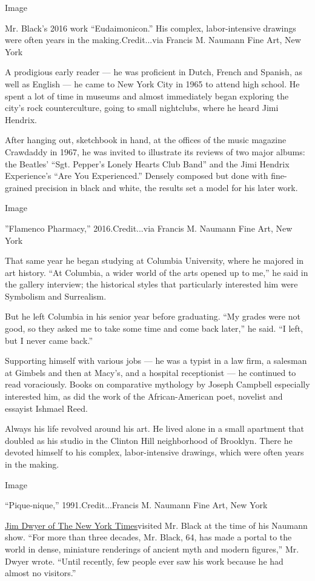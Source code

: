 Image

Mr. Black's 2016 work ``Eudaimonicon.'' His complex, labor-intensive
drawings were often years in the making.Credit...via Francis M. Naumann
Fine Art, New York

A prodigious early reader --- he was proficient in Dutch, French and
Spanish, as well as English --- he came to New York City in 1965 to
attend high school. He spent a lot of time in museums and almost
immediately began exploring the city's rock counterculture, going to
small nightclubs, where he heard Jimi Hendrix.

After hanging out, sketchbook in hand, at the offices of the music
magazine Crawdaddy in 1967, he was invited to illustrate its reviews of
two major albums: the Beatles' ``Sgt. Pepper's Lonely Hearts Club Band''
and the Jimi Hendrix Experience's ``Are You Experienced.'' Densely
composed but done with fine-grained precision in black and white, the
results set a model for his later work.

Image

''Flamenco Pharmacy,'' 2016.Credit...via Francis M. Naumann Fine Art,
New York

That same year he began studying at Columbia University, where he
majored in art history. ``At Columbia, a wider world of the arts opened
up to me,'' he said in the gallery interview; the historical styles that
particularly interested him were Symbolism and Surrealism.

But he left Columbia in his senior year before graduating. ``My grades
were not good, so they asked me to take some time and come back later,''
he said. ``I left, but I never came back.''

Supporting himself with various jobs --- he was a typist in a law firm,
a salesman at Gimbels and then at Macy's, and a hospital receptionist
--- he continued to read voraciously. Books on comparative mythology by
Joseph Campbell especially interested him, as did the work of the
African-American poet, novelist and essayist Ishmael Reed.

Always his life revolved around his art. He lived alone in a small
apartment that doubled as his studio in the Clinton Hill neighborhood of
Brooklyn. There he devoted himself to his complex, labor-intensive
drawings, which were often years in the making.

Image

``Pique-nique,'' 1991.Credit...Francis M. Naumann Fine Art, New York

\href{https://www.nytimes.com/2013/06/05/nyregion/discovered-at-64-a-brooklyn-artist-takes-his-place.html}{Jim
Dwyer of The New York Times}visited Mr. Black at the time of his Naumann
show. ``For more than three decades, Mr. Black, 64, has made a portal to
the world in dense, miniature renderings of ancient myth and modern
figures,'' Mr. Dwyer wrote. ``Until recently, few people ever saw his
work because he had almost no visitors.''

